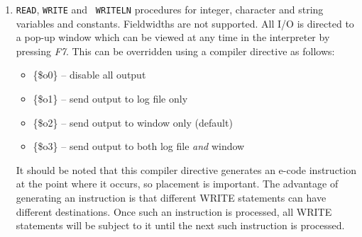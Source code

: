 \begin{enumerate}
\item {\tt READ}, {\tt WRITE} and {\tt
WRITELN} procedures for integer, character and string variables and
constants. Fieldwidths are not supported. All I/O is directed to a
pop-up window which can be viewed at any time in the interpreter by
pressing {\em F7}. This can be overridden using a compiler directive
as follows:
\begin{itemize}
\item \{\$o0\} -- disable all output
\item \{\$o1\} -- send output to log file only
\item \{\$o2\} -- send output to window only (default)
\item \{\$o3\} -- send output to both log file {\em and} window
\end{itemize}
It should be noted that this compiler directive generates an e-code
instruction at the point where it occurs, so placement is important.
The advantage of generating an instruction is that different WRITE
statements can have different destinations. Once such an
instruction is processed, all WRITE statements will be subject to it
until the next such instruction is processed.


\end{enumerate}
